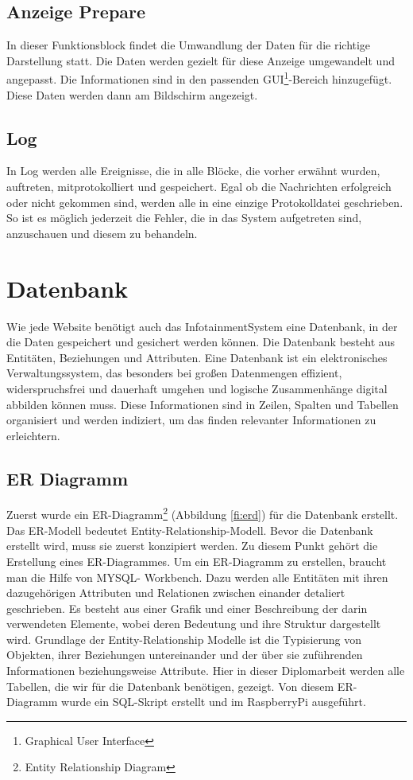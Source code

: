 \subsection{Anzeige Prepare}
In dieser Funktionsblock findet die Umwandlung der Daten für die richtige Darstellung statt. Die Daten werden gezielt für diese Anzeige umgewandelt und angepasst. Die Informationen sind in den passenden GUI\footnote{Graphical User Interface}-Bereich hinzugefügt. Diese Daten werden dann am Bildschirm angezeigt.

\subsection{Log}
In Log werden alle Ereignisse, die in alle Blöcke, die vorher erwähnt wurden, auftreten, mitprotokolliert und gespeichert.  Egal ob die Nachrichten erfolgreich oder nicht gekommen sind, werden alle in eine einzige Protokolldatei geschrieben. So ist es möglich jederzeit die Fehler, die in das System aufgetreten sind, anzuschauen und diesem zu behandeln.

\section{Datenbank}
Wie jede Website benötigt auch das InfotainmentSystem eine Datenbank, in der die Daten gespeichert und gesichert werden können. Die Datenbank besteht aus Entitäten, Beziehungen und Attributen. Eine Datenbank ist ein elektronisches Verwaltungssystem, das besonders bei großen Datenmengen effizient, widerspruchsfrei und dauerhaft umgehen und logische Zusammenhänge digital abbilden können muss. Diese Informationen sind in Zeilen, Spalten und Tabellen organisiert und werden indiziert, um das finden relevanter Informationen zu erleichtern.

\subsection{ER Diagramm}
Zuerst wurde ein ER-Diagramm\footnote{Entity Relationship Diagram} (Abbildung \ref{fi:erd}) für die Datenbank erstellt. Das ER-Modell bedeutet Entity-Relationship-Modell. Bevor die Datenbank erstellt wird, muss sie zuerst konzipiert werden. Zu diesem Punkt gehört die Erstellung eines ER-Diagrammes. Um ein ER-Diagramm zu erstellen, braucht man die Hilfe von MYSQL- Workbench. Dazu werden alle Entitäten mit ihren dazugehörigen Attributen und Relationen zwischen einander detaliert geschrieben. Es besteht aus einer Grafik und einer Beschreibung der darin verwendeten Elemente, wobei deren Bedeutung und ihre Struktur dargestellt wird. Grundlage der Entity-Relationship Modelle ist die Typisierung von Objekten, ihrer Beziehungen untereinander und der über sie zuführenden Informationen beziehungsweise Attribute. Hier in dieser Diplomarbeit werden alle Tabellen, die wir für die Datenbank benötigen, gezeigt. Von diesem ER-Diagramm wurde ein SQL-Skript erstellt und im RaspberryPi ausgeführt.

